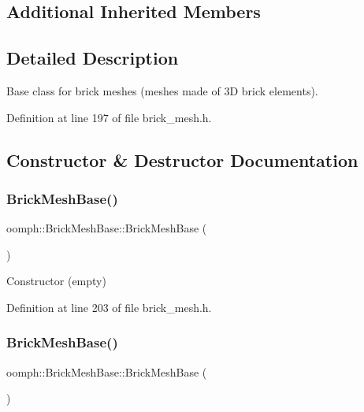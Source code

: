 \subsection*{Additional Inherited Members}


\subsection{Detailed Description}
Base class for brick meshes (meshes made of 3D brick elements). 

Definition at line 197 of file brick\+\_\+mesh.\+h.



\subsection{Constructor \& Destructor Documentation}
\mbox{\label{classoomph_1_1BrickMeshBase_aab28517a83f91d118db9ce6b80a0d0a2}} 
\subsubsection{\texorpdfstring{Brick\+Mesh\+Base()}{BrickMeshBase()}\hspace{0.1cm}{\footnotesize\ttfamily [1/2]}}
{\footnotesize\ttfamily oomph\+::\+Brick\+Mesh\+Base\+::\+Brick\+Mesh\+Base (\begin{DoxyParamCaption}{ }\end{DoxyParamCaption})\hspace{0.3cm}{\ttfamily [inline]}}



Constructor (empty) 



Definition at line 203 of file brick\+\_\+mesh.\+h.

\mbox{\label{classoomph_1_1BrickMeshBase_a451d5198262174d67dc442a9ef72e9c3}} 
\subsubsection{\texorpdfstring{Brick\+Mesh\+Base()}{BrickMeshBase()}\hspace{0.1cm}{\footnotesize\ttfamily [2/2]}}
{\footnotesize\ttfamily oomph\+::\+Brick\+Mesh\+Base\+::\+Brick\+Mesh\+Base (\begin{DoxyParamCaption}\item[{const \hyperlink{classoomph_1_1BrickMeshBase}{Brick\+Mesh\+Base} \&}]{ }\end{DoxyParamCaption})\hspace{0.3cm}{\ttfamily [inline]}}



